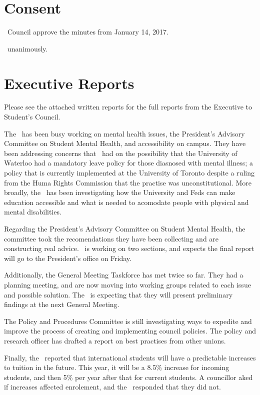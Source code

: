 \section*{Consent}

\begin{motion}
    \birt\ Council approve the minutes from January 14, 2017.
    \movers{\seneca}{\brian}

    \carries\ unanimously.
\end{motion}

\section*{Executive Reports}

Please see the attached written reports for the full reports from the Executive
to Student's Council. 

\begin{information}

    The \pres\ has been busy working on mental health issues, the President's 
    Advisory Committee on Student Mental Health, and accessibility on campus.
    They have been addressing concerns that \nickta\ had on the possibility
    that the University of Waterloo had a mandatory leave policy for those
    diasnosed with mental illness; a policy that is currently implemented at
    the University of Toronto despite a ruling from the Huma Rights Commission
    that the practise was unconstitutional.  More broadly, the \pres\ has been
    investigating how the University and Feds can make education accessible and
    what is needed to acomodate people with physical and mental disabilities. 

    Regarding the President's Advisory Committee on Student Mental Health, the
    committee took the recomendations they have been collecting and are
    constructing real advice. \pres\ is working on two sections, and expects
    the final report will go to the President's office on Friday. 

    Additionally, the General Meeting Taskforce has met twice so far. They had
    a planning meeting, and are now moving into working groups related to each
    issue and possible solution. The \pres\ is expecting that they will present
    preliminary findings at the next General Meeting. 

    The Policy and Procedures Committee is still investigating ways to 
    expedite and improve the process of creating and implementing council 
    policies. The policy and research officer has drafted a report on best 
    practises from other unions.

    Finally, the \pres\ reported that international students will have a 
    predictable increases to tuition in the future. This year, it will be a 
    8.5\% increase for incoming students, and then 5\% per year after that for 
    current students. A councillor aked if increases affected enrolement, and
    the \pres\ responded that they did not.

\end{information}

